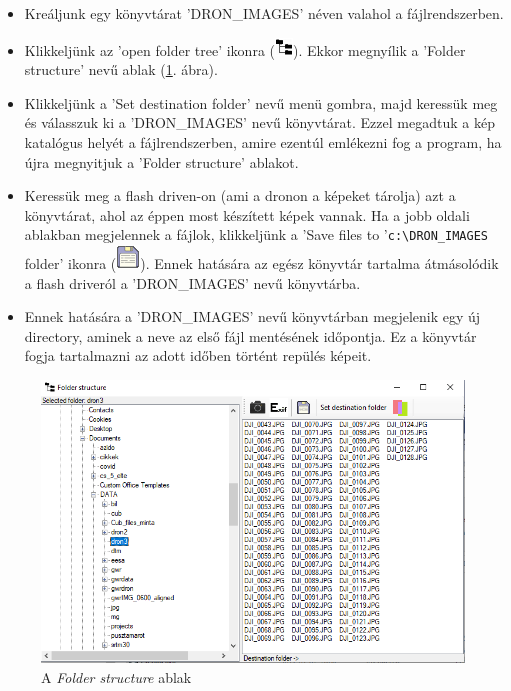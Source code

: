 \documentclass[a4paper,12pt]{article}
\begin{document}
\begin{itemize}
	\item Kreáljunk egy könyvtárat 'DRON\_IMAGES' néven valahol a fájlrendszerben.
	
	\item Klikkeljünk az 'open folder tree' ikonra (\includegraphics{open_folder_structure.png}). Ekkor megnyílik a 'Folder structure' nevű ablak (\ref{fig:folder_struc}. ábra).
	
	\item Klikkeljünk a 'Set destination folder' nevű menü gombra, majd keressük meg és válasszuk ki a 'DRON\_IMAGES' nevű könyvtárat. Ezzel megadtuk a kép katalógus helyét a fájlrendszerben, amire ezentúl emlékezni fog a program, ha újra megnyitjuk a 'Folder structure' ablakot. 
	
	\item Keressük meg a flash driven-on (ami a dronon a képeket tárolja) azt a könyvtárat, ahol az éppen most készített képek vannak. Ha a jobb oldali ablakban megjelennek a fájlok, klikkeljünk a 'Save files to '\verb|c:\DRON_IMAGES| folder' ikonra (\includegraphics{save.png}). Ennek hatására az egész könyvtár tartalma átmásolódik a flash driveról a 'DRON\_IMAGES' nevű könyvtárba.
	
	\item Ennek hatására a 'DRON\_IMAGES' nevű könyvtárban megjelenik egy új directory, aminek a neve az első fájl mentésének időpontja. Ez a könyvtár fogja tartalmazni az adott időben történt repülés képeit.
\end{itemize}

\begin{figure}
	\centering
	\includegraphics[width=13cm]{folder_struc.png}
	\caption{A \textit{Folder structure} ablak}
	\label{fig:folder_struc}
\end{figure}
\end{document}

